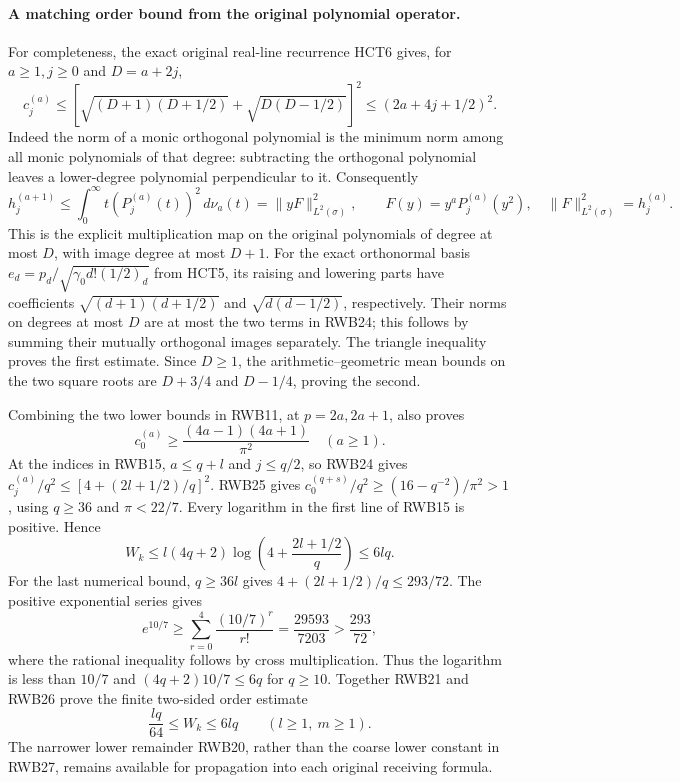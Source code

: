 \documentclass[11pt,a4paper]{article}
\begin{document}
\paragraph{A matching order bound from the original polynomial operator.}
For completeness, the exact original real-line recurrence HCT6 gives,
for $a\ge1,j\ge0$ and $D=a+2j$,
\[
 c_j^{(a)}\le
 \left[\sqrt{(D+1)(D+1/2)}+\sqrt{D(D-1/2)}\right]^2
 \le(2a+4j+1/2)^2.
 \tag{RWB24}
\]
Indeed the norm of a monic orthogonal polynomial is the minimum norm
among all monic polynomials of that degree: subtracting the orthogonal
polynomial leaves a lower-degree polynomial perpendicular to it.
Consequently
\[
 h_j^{(a+1)}\le\int_0^\infty
                  t(P_j^{(a)}(t))^2\,d\nu_a(t)
 =\|yF\|_{L^2(\sigma)}^2,\qquad
 F(y)=y^aP_j^{(a)}(y^2),\quad
 \|F\|_{L^2(\sigma)}^2=h_j^{(a)}.
\]
This is the explicit multiplication map on the original polynomials of
degree at most $D$, with image degree at most $D+1$.
For the exact orthonormal basis $e_d=p_d/\sqrt{\gamma_0d!(1/2)_d}$
from HCT5, its raising and lowering parts have coefficients
$\sqrt{(d+1)(d+1/2)}$ and $\sqrt{d(d-1/2)}$, respectively.
Their norms on degrees at most $D$ are at most the two terms in
RWB24; this follows by summing their mutually orthogonal images
separately. The triangle inequality proves the first estimate.
Since $D\ge1$, the arithmetic--geometric mean bounds on the two
square roots are $D+3/4$ and $D-1/4$, proving the second.

Combining the two lower bounds in RWB11, at $p=2a,2a+1$, also proves
\[
 c_0^{(a)}\ge\frac{(4a-1)(4a+1)}{\pi^2}\quad(a\ge1).
 \tag{RWB25}
\]
At the indices in RWB15, $a\le q+l$ and $j\le q/2$, so RWB24 gives
$c_j^{(a)}/q^2\le[4+(2l+1/2)/q]^2$. RWB25 gives
$c_0^{(q+s)}/q^2\ge(16-q^{-2})/\pi^2>1$, using $q\ge36$
and $\pi<22/7$. Every logarithm in the first line of RWB15 is
positive. Hence
\[
 W_k\le l(4q+2)\log\left(4+\frac{2l+1/2}{q}\right)
 \le6lq.
 \tag{RWB26}
\]
For the last numerical bound, $q\ge36l$ gives
$4+(2l+1/2)/q\le293/72$.
The positive exponential series gives
\[
 e^{10/7}\ge\sum_{r=0}^4\frac{(10/7)^r}{r!}
 =\frac{29593}{7203}>\frac{293}{72},
\]
where the rational inequality follows by cross multiplication.
Thus the logarithm is less than $10/7$ and
$(4q+2)10/7\le6q$ for $q\ge10$.
Together RWB21 and RWB26 prove the finite two-sided order estimate
\[
 \boxed{\displaystyle \frac{lq}{64}\le W_k\le6lq
 \qquad(l\ge1,\ m\ge1).}
 \tag{RWB27}
\]
The narrower lower remainder RWB20, rather than the coarse lower
constant in RWB27, remains available for propagation into each
original receiving formula.
\end{document}
